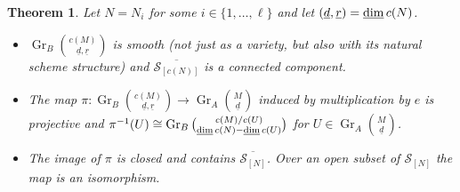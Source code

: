 \documentclass[11pt,a4paper]{amsart}
\theoremstyle{plain}
\newtheorem{thm}{Theorem}[section]
\theoremstyle{definition}
\begin{document}
\begin{thm} Let $N=N_i$ for some $i\in\{1, \ldots , \ell\}$ and let $({\underline{d}},{\underline{r}}) = \operatorname{\rm \underline{dim}} {c} (N)$.
\begin{itemize}
\item[(1)]
${\operatorname{Gr}_B \binom{{c} (M)}{\underline{d}, \underline{r}}}$ is smooth (not just as a variety, but also with its natural scheme structure) and $\overline{{\mathcal{S}}_{[c(N)]}}$ is a connected component. 
\item[(2)] 
The map $\pi\colon {\operatorname{Gr}_B \binom{{c} (M)}{\underline{d}, \underline{r}}}\to {\operatorname{Gr}_A \binom{M}{\underline{d}}}$ induced by multiplication by $e$ is projective
and $\pi^{-1}(U) \cong \operatorname{Gr}_B\binom{{c} (M)/{c} (U)}{\operatorname{\rm \underline{dim}} {c} (N)-\operatorname{\rm \underline{dim}} {c} (U)}$ for
$U\in {\operatorname{Gr}_A \binom{M}{\underline{d}}}$.
\item[(3)] 
The image of $\pi $ is closed and contains $\overline{\mathcal{S}_{[N]}}$. Over an open subset of ${\mathcal{S}_{[N]}}$ the map is an isomorphism.  

\end{itemize}
\end{thm}
\end{document}
